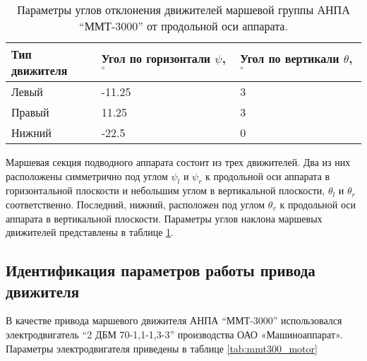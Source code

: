\begin{table}
    \caption{Параметры углов отклонения движителей маршевой группы АНПА ``ММТ-3000'' от продольной оси аппарата.}
    \label{tab:mmt3000_propulsion_angles}
    \centering
    \begin{tabular}{lll}
        \toprule
        Тип движителя & Угол по горизонтали $\psi$, $^{\circ}$  & Угол по вертикали $\theta$, $^{\circ}$ \\
        \midrule
        Левый  & -11.25 & 3 \\
        Правый &  11.25 & 3 \\
        Нижний &  -22.5 & 0 \\
        \bottomrule
    \end{tabular}
\end{table}

Маршевая секция подводного аппарата состоит из трех движителей.
Два из них расположены симметрично под углом $\psi_l$ и $\psi_r$ к продольной оси аппарата в горизонтальной плоскости и небольшим углом в вертикальной плоскости, $\theta_l$ и $\theta_r$ соответственно.
Последний, нижний, расположен под углом $\theta_v$ к продольной оси аппарата в вертикальной плоскости.
Параметры углов наклона маршевых движителей представлены в таблице \ref{tab:mmt3000_propulsion_angles}.

\subsection{Идентификация параметров работы привода движителя}
В качестве привода маршевого движителя АНПА ``ММТ-3000'' использовался электродвигатель ``2 ДБМ 70-1,1-1,3-3'' производства ОАО «Машиноаппарат».
Параметры электродвигателя приведены в таблице \ref{tab:mmt300_motor}

